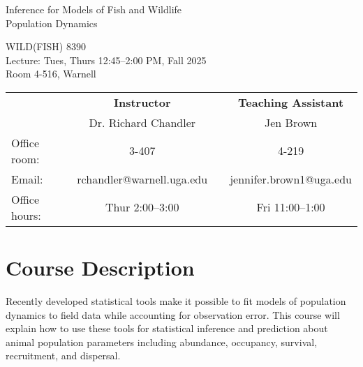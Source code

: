\documentclass[12pt]{article}
\begin{document}
{\centering

{\Large \sc
  Inference for Models of Fish and Wildlife \\ Population Dynamics  
}
\vspace{6pt}

WILD(FISH) 8390  \\
Lecture: Tues, Thurs 12:45--2:00 PM, Fall 2025 \\
Room 4-516, Warnell \\


\normalsize

\vspace{12pt}

\begin{tabular}[h!]{lccc}
                     & \textbf{Instructor}       & \hspace{0.01cm} & \textbf{Teaching Assistant} \\
                     & Dr. Richard Chandler      &                 & Jen Brown                \\
Office room:         & 3-407                     &                 & 4-219                       \\
Email:               & rchandler@warnell.uga.edu &                 & jennifer.brown1@uga.edu       \\
Office hours:        & Thur 2:00--3:00           &                 & Fri 11:00--1:00             \\
\end{tabular}


}



\normalsize


\vspace{-2mm}
\section*{\normalsize Course Description}
\vspace{-4mm}
Recently developed statistical tools make it possible to fit models of
population dynamics to field data while accounting for observation
error. This course will explain how to use these tools for statistical
inference and prediction about animal population parameters including
abundance, occupancy, survival, recruitment, and dispersal.   
\end{document}
